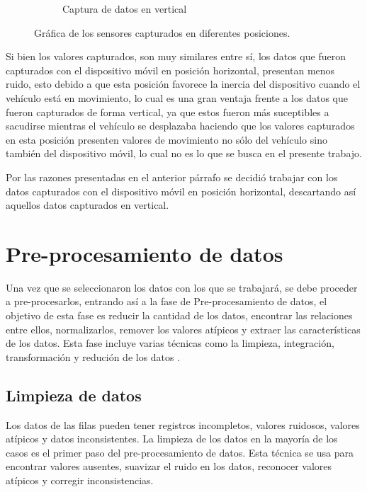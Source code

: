 \begin{figure}
{\begin{subfigure}[h]{0.47\textwidth}
            \caption{Captura de datos en vertical}
            \label{fig:ver}
        \end{subfigure}
        \caption{Gr\'{a}fica de los sensores capturados en diferentes posiciones.}
        		\label{fig:verHor}}
    \end{figure}

\vspace{5mm} %

Si bien los valores capturados, son muy similares entre s\'{i}, los datos que fueron capturados con el dispositivo m\'{o}vil en posici\'{o}n horizontal, presentan menos ruido, esto debido a que esta posici\'{o}n favorece la inercia del dispositivo cuando el veh\'{i}culo est\'{a} en movimiento, lo cual es una gran ventaja frente a los datos que fueron capturados de forma vertical, ya que estos fueron m\'{a}s suceptibles a sacudirse mientras el veh\'{i}culo se desplazaba haciendo que los valores capturados en esta posici\'{o}n presenten valores de movimiento no s\'{o}lo del veh\'{i}culo sino tambi\'{e}n del dispositivo m\'{o}vil, lo cual no es lo que se busca en el presente trabajo.

\vspace{5mm} %

Por las razones presentadas en el anterior p\'{a}rrafo se decidi\'{o} trabajar con los datos capturados con el dispositivo m\'{o}vil en posici\'{o}n horizontal, descartando as\'{i} aquellos datos capturados en vertical.

\section{Pre-procesamiento de datos}

Una vez que se seleccionaron los datos con los que se trabajar\'{a}, se debe proceder a pre-procesarlos, entrando as\'{i} a la fase de Pre-procesamiento de datos, el objetivo de esta fase es reducir la cantidad de los datos, encontrar las relaciones entre ellos, normalizarlos, remover los valores at\'{i}picos y extraer las caracter\'{i}sticas de los datos. Esta fase incluye varias t\'{e}cnicas como la limpieza, integraci\'{o}n, transformaci\'{o}n y reduci\'{o}n de los datos \cite{38}.

\subsection{Limpieza de datos}

Los datos de las filas pueden tener registros incompletos, valores ruidosos, valores at\'{i}picos y datos inconsistentes. La limpieza de los datos en la mayor\'{i}a de los casos es el primer paso del pre-procesamiento de datos. Esta t\'{e}cnica se usa para encontrar valores ausentes, suavizar el ruido en los datos, reconocer valores at\'{i}picos y corregir inconsistencias.

